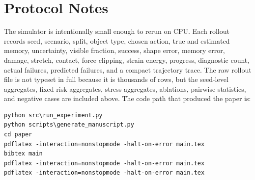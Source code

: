 \documentclass{article}
\begin{document}
\section{Protocol Notes}
The simulator is intentionally small enough to rerun on CPU. Each rollout records seed, scenario, split, object type, chosen action, true and estimated memory, uncertainty, visible fraction, success, shape error, memory error, damage, stretch, contact, force clipping, strain energy, progress, diagnostic count, actual failures, predicted failures, and a compact trajectory trace. The raw rollout file is not typeset in full because it is thousands of rows, but the seed-level aggregates, fixed-risk aggregates, stress aggregates, ablations, pairwise statistics, and negative cases are included above. The code path that produced the paper is:
\begin{verbatim}
python src\run_experiment.py
python scripts\generate_manuscript.py
cd paper
pdflatex -interaction=nonstopmode -halt-on-error main.tex
bibtex main
pdflatex -interaction=nonstopmode -halt-on-error main.tex
pdflatex -interaction=nonstopmode -halt-on-error main.tex
\end{verbatim}



\end{document}
